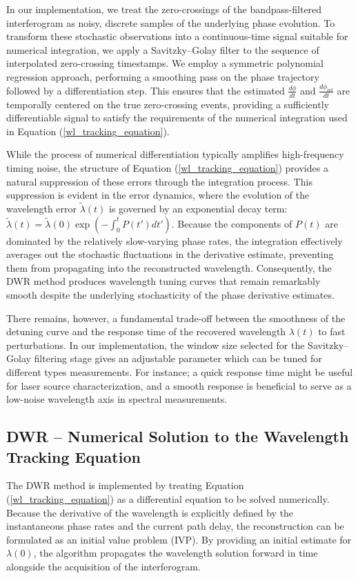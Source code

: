 \documentclass[8pt,a4paper]{report}
\begin{document}
	In our implementation, we treat the zero-crossings of the bandpass-filtered interferogram as noisy, discrete samples of the underlying phase evolution. To transform these stochastic observations into a continuous-time signal suitable for numerical integration, we apply a Savitzky–Golay filter \cite{savitzky_golay_paper} to the sequence of interpolated zero-crossing timestamps. We employ a symmetric polynomial regression approach, performing a smoothing pass on the phase trajectory followed by a differentiation step. This ensures that the estimated $\frac{d\phi}{dt}$ and $\frac{d\phi_\mathrm{ref}}{dt}$ are temporally centered on the true zero-crossing events, providing a sufficiently differentiable signal to satisfy the requirements of the numerical integration used in Equation (\ref{wl_tracking_equation}).
	
	While the process of numerical differentiation typically amplifies high-frequency timing noise, the structure of Equation (\ref{wl_tracking_equation}) provides a natural suppression of these errors through the integration process. This suppression is evident in the error dynamics, where the evolution of the wavelength error $\tilde{\lambda}(t)$ is governed by an exponential decay term: $\tilde{\lambda}(t) = \tilde{\lambda}(0) \exp\left( -\int_{0}^{t} P(t') dt' \right)$. Because the components of $P(t)$ are dominated by the relatively slow-varying phase rates, the integration effectively averages out the stochastic fluctuations in the derivative estimate, preventing them from propagating into the reconstructed wavelength. Consequently, the DWR method produces wavelength tuning curves that remain remarkably smooth despite the underlying stochasticity of the phase derivative estimates.
	
	There remains, however, a fundamental trade-off between the smoothness of the detuning curve and the response time of the recovered wavelength $\lambda(t)$ to fast perturbations. In our implementation, the window size selected for the Savitzky–Golay filtering stage gives an adjustable parameter which can be tuned for different types measurements. For instance; a quick response time might be useful for laser source characterization, and a smooth response is beneficial to serve as a low-noise wavelength axis in spectral measurements. 
	
	\subsection{DWR -- Numerical Solution to the Wavelength Tracking Equation}
	The DWR method is implemented by treating Equation (\ref{wl_tracking_equation}) as a differential equation to be solved numerically. Because the derivative of the wavelength is explicitly defined by the instantaneous phase rates and the current path delay, the reconstruction can be formulated as an initial value problem (IVP). By providing an initial estimate for $\lambda(0)$, the algorithm propagates the wavelength solution forward in time alongside the acquisition of the interferogram.
		
\end{document}
